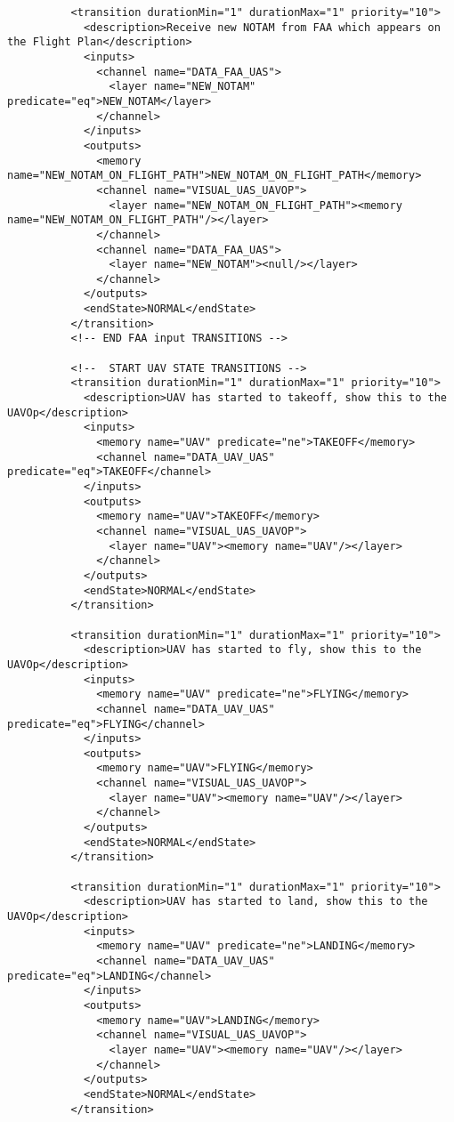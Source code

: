 \begin{verbatim}
          <transition durationMin="1" durationMax="1" priority="10">
            <description>Receive new NOTAM from FAA which appears on the Flight Plan</description>
            <inputs>
              <channel name="DATA_FAA_UAS">
                <layer name="NEW_NOTAM" predicate="eq">NEW_NOTAM</layer>
              </channel>
            </inputs>
            <outputs>
              <memory name="NEW_NOTAM_ON_FLIGHT_PATH">NEW_NOTAM_ON_FLIGHT_PATH</memory>
              <channel name="VISUAL_UAS_UAVOP">
                <layer name="NEW_NOTAM_ON_FLIGHT_PATH"><memory name="NEW_NOTAM_ON_FLIGHT_PATH"/></layer>
              </channel>
              <channel name="DATA_FAA_UAS">
                <layer name="NEW_NOTAM"><null/></layer>
              </channel>
            </outputs>
            <endState>NORMAL</endState>
          </transition>
          <!-- END FAA input TRANSITIONS -->         
                     
          <!--  START UAV STATE TRANSITIONS -->
          <transition durationMin="1" durationMax="1" priority="10">
            <description>UAV has started to takeoff, show this to the UAVOp</description>
            <inputs>
              <memory name="UAV" predicate="ne">TAKEOFF</memory>
              <channel name="DATA_UAV_UAS" predicate="eq">TAKEOFF</channel>
            </inputs>
            <outputs>
              <memory name="UAV">TAKEOFF</memory>
              <channel name="VISUAL_UAS_UAVOP">
                <layer name="UAV"><memory name="UAV"/></layer>
              </channel>
            </outputs>
            <endState>NORMAL</endState>
          </transition>
          
          <transition durationMin="1" durationMax="1" priority="10">
            <description>UAV has started to fly, show this to the UAVOp</description>
            <inputs>
              <memory name="UAV" predicate="ne">FLYING</memory>
              <channel name="DATA_UAV_UAS" predicate="eq">FLYING</channel>
            </inputs>
            <outputs>
              <memory name="UAV">FLYING</memory>
              <channel name="VISUAL_UAS_UAVOP">
                <layer name="UAV"><memory name="UAV"/></layer>
              </channel>
            </outputs>
            <endState>NORMAL</endState>
          </transition>
          
          <transition durationMin="1" durationMax="1" priority="10">
            <description>UAV has started to land, show this to the UAVOp</description>
            <inputs>
              <memory name="UAV" predicate="ne">LANDING</memory>
              <channel name="DATA_UAV_UAS" predicate="eq">LANDING</channel>
            </inputs>
            <outputs>
              <memory name="UAV">LANDING</memory>
              <channel name="VISUAL_UAS_UAVOP">
                <layer name="UAV"><memory name="UAV"/></layer>
              </channel>
            </outputs>
            <endState>NORMAL</endState>
          </transition>
          

\end{verbatim}

